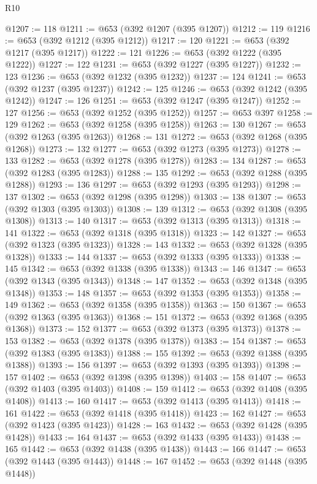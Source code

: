 \begin{lexlean}{R10}
\begin{coremodule}
@1207 := 118
@1211 := @653 (@392 @1207 (@395 @1207))
@1212 := 119
@1216 := @653 (@392 @1212 (@395 @1212))
@1217 := 120
@1221 := @653 (@392 @1217 (@395 @1217))
@1222 := 121
@1226 := @653 (@392 @1222 (@395 @1222))
@1227 := 122
@1231 := @653 (@392 @1227 (@395 @1227))
@1232 := 123
@1236 := @653 (@392 @1232 (@395 @1232))
@1237 := 124
@1241 := @653 (@392 @1237 (@395 @1237))
@1242 := 125
@1246 := @653 (@392 @1242 (@395 @1242))
@1247 := 126
@1251 := @653 (@392 @1247 (@395 @1247))
@1252 := 127
@1256 := @653 (@392 @1252 (@395 @1252))
@1257 := @653 @397
@1258 := 129
@1262 := @653 (@392 @1258 (@395 @1258))
@1263 := 130
@1267 := @653 (@392 @1263 (@395 @1263))
@1268 := 131
@1272 := @653 (@392 @1268 (@395 @1268))
@1273 := 132
@1277 := @653 (@392 @1273 (@395 @1273))
@1278 := 133
@1282 := @653 (@392 @1278 (@395 @1278))
@1283 := 134
@1287 := @653 (@392 @1283 (@395 @1283))
@1288 := 135
@1292 := @653 (@392 @1288 (@395 @1288))
@1293 := 136
@1297 := @653 (@392 @1293 (@395 @1293))
@1298 := 137
@1302 := @653 (@392 @1298 (@395 @1298))
@1303 := 138
@1307 := @653 (@392 @1303 (@395 @1303))
@1308 := 139
@1312 := @653 (@392 @1308 (@395 @1308))
@1313 := 140
@1317 := @653 (@392 @1313 (@395 @1313))
@1318 := 141
@1322 := @653 (@392 @1318 (@395 @1318))
@1323 := 142
@1327 := @653 (@392 @1323 (@395 @1323))
@1328 := 143
@1332 := @653 (@392 @1328 (@395 @1328))
@1333 := 144
@1337 := @653 (@392 @1333 (@395 @1333))
@1338 := 145
@1342 := @653 (@392 @1338 (@395 @1338))
@1343 := 146
@1347 := @653 (@392 @1343 (@395 @1343))
@1348 := 147
@1352 := @653 (@392 @1348 (@395 @1348))
@1353 := 148
@1357 := @653 (@392 @1353 (@395 @1353))
@1358 := 149
@1362 := @653 (@392 @1358 (@395 @1358))
@1363 := 150
@1367 := @653 (@392 @1363 (@395 @1363))
@1368 := 151
@1372 := @653 (@392 @1368 (@395 @1368))
@1373 := 152
@1377 := @653 (@392 @1373 (@395 @1373))
@1378 := 153
@1382 := @653 (@392 @1378 (@395 @1378))
@1383 := 154
@1387 := @653 (@392 @1383 (@395 @1383))
@1388 := 155
@1392 := @653 (@392 @1388 (@395 @1388))
@1393 := 156
@1397 := @653 (@392 @1393 (@395 @1393))
@1398 := 157
@1402 := @653 (@392 @1398 (@395 @1398))
@1403 := 158
@1407 := @653 (@392 @1403 (@395 @1403))
@1408 := 159
@1412 := @653 (@392 @1408 (@395 @1408))
@1413 := 160
@1417 := @653 (@392 @1413 (@395 @1413))
@1418 := 161
@1422 := @653 (@392 @1418 (@395 @1418))
@1423 := 162
@1427 := @653 (@392 @1423 (@395 @1423))
@1428 := 163
@1432 := @653 (@392 @1428 (@395 @1428))
@1433 := 164
@1437 := @653 (@392 @1433 (@395 @1433))
@1438 := 165
@1442 := @653 (@392 @1438 (@395 @1438))
@1443 := 166
@1447 := @653 (@392 @1443 (@395 @1443))
@1448 := 167
@1452 := @653 (@392 @1448 (@395 @1448))

\end{coremodule}
\end{lexlean}
